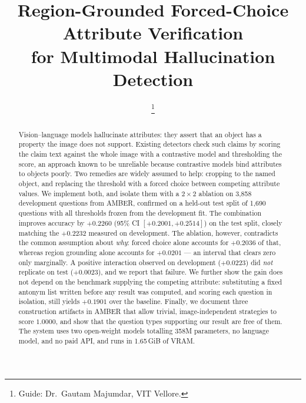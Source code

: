 \documentclass[conference]{IEEEtran}
\begin{document}
\title{Region-Grounded Forced-Choice Attribute Verification\\
for Multimodal Hallucination Detection}

\author{
\thanks{Guide: Dr.\ Gautam Majumdar, VIT Vellore.}}

\maketitle

\begin{abstract}
Vision--language models hallucinate attributes: they assert that an object has a
property the image does not support. Existing detectors check such claims by
scoring the claim text against the whole image with a contrastive model and
thresholding the score, an approach known to be unreliable because contrastive
models bind attributes to objects poorly. Two remedies are widely assumed to
help: cropping to the named object, and replacing the threshold with a forced
choice between competing attribute values. We implement both, and isolate them
with a $2\times2$ ablation on 3{,}858 development questions from AMBER,
confirmed on a held-out test split of 1{,}690 questions with all thresholds
frozen from the development fit. The combination improves accuracy by
$+0.2260$ (95\% CI $[+0.2001, +0.2514]$) on the test split, closely matching the
$+0.2232$ measured on development. The ablation, however, contradicts the common
assumption about \emph{why}: forced choice alone accounts for $+0.2036$ of that,
whereas region grounding alone accounts for $+0.0201$ --- an interval that clears
zero only marginally. A positive interaction observed on development
($+0.0223$) did \emph{not} replicate on test ($+0.0023$), and we report that
failure. We further show the gain does not depend on the benchmark supplying the
competing attribute: substituting a fixed antonym list written before any result
was computed, and scoring each question in isolation, still yields $+0.1901$ over
the baseline. Finally, we
document three construction artifacts in AMBER that allow trivial,
image-independent strategies to score $1.0000$, and show that the question types
supporting our result are free of them. The system uses two open-weight models
totalling 358M parameters, no language model, and no paid API, and runs in
1.65\,GiB of VRAM.
\end{abstract}
\end{document}
